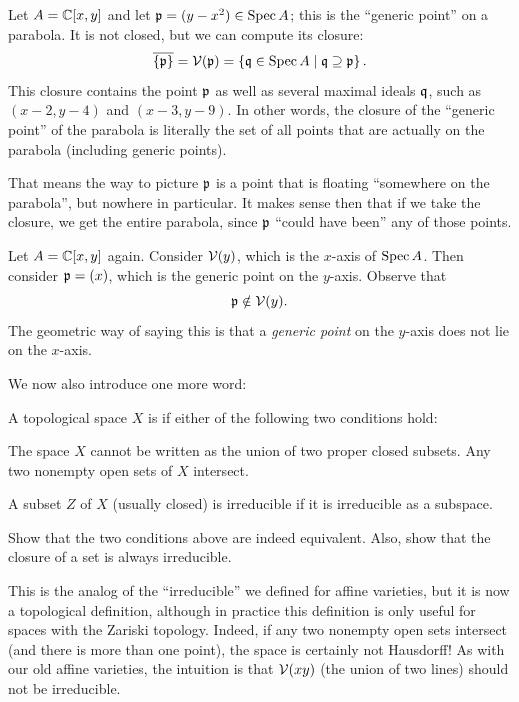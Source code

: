 \begin{example}
	Let $A = \mathbb C[x,y]$ and let $\mathfrak p = (y-x^2) \in \operatorname{Spec} A$;
	this is the ``generic point'' on a parabola.
	It is not closed, but we can compute its closure:
	\[
		\overline{\{\mathfrak p\}}
		= \mathcal V(\mathfrak p) = \left\{ \mathfrak q \in \operatorname{Spec} A \mid \mathfrak q \supseteq \mathfrak p \right\}.
	\]
	This closure contains the point $\mathfrak p$ as well
	as several maximal ideals $\mathfrak q$, such as $(x-2,y-4)$ and $(x-3,y-9)$.
	In other words, the closure of the ``generic point'' of the parabola
	is literally the set of all points that are actually on the parabola
	(including generic points).

	That means the way to picture $\mathfrak p$ is a point that
	is floating ``somewhere on the parabola'', but nowhere in particular.
	It makes sense then that if we take the closure,
	we get the entire parabola,
	since $\mathfrak p$ ``could have been'' any of those points.
\end{example}


\begin{example}
	Let $A = \mathbb C[x,y]$ again.
	Consider $\mathcal V(y)$, which is the $x$-axis of $\operatorname{Spec} A$.
	Then consider $\mathfrak p = (x)$, which is the generic point on the $y$-axis.
	Observe that
	\[ \mathfrak p \notin \mathcal V(y). \]
	The geometric way of saying this is that a \emph{generic point}
	on the $y$-axis does not lie on the $x$-axis.
\end{example}

We now also introduce one more word:
\begin{definition}
	A topological space $X$ is 
	if either of the following two conditions hold:
	\begin{itemize}
		\ii The space $X$ cannot be written as the
		union of two proper closed subsets.
		\ii Any two nonempty open sets of $X$ intersect.
	\end{itemize}
	A subset $Z$ of $X$ (usually closed) is irreducible
	if it is irreducible as a subspace.
\end{definition}
\begin{exercise}
	Show that the two conditions above are indeed equivalent.
	Also, show that the closure of a set is always irreducible.
\end{exercise}

This is the analog of the ``irreducible''
we defined for affine varieties,
but it is now a topological definition,
although in practice this definition is only
useful for spaces with the Zariski topology.
Indeed, if any two nonempty open sets intersect
(and there is more than one point),
the space is certainly not Hausdorff!
As with our old affine varieties,
the intuition is that $\mathcal V(xy)$ (the union of two lines)
should not be irreducible.

